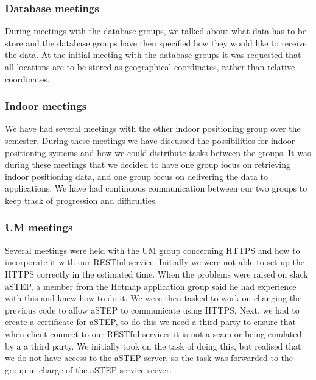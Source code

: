 \subsubsection*{Database meetings}
During meetings with the database groups, we talked about what data has to be store and the database groups have then specified how they would like to receive the data. At the initial meeting with the database groups it was requested that all locations are to be stored as geographical coordinates, rather than relative coordinates.

\subsubsection*{Indoor meetings}
We have had several meetings with the other indoor positioning group over the semester. During these meetings we have discussed the possibilities for indoor positioning systems and how we could distribute tasks between the groups. It was during these meetings that we decided to have one group focus on retrieving indoor positioning data, and one group focus on delivering the data to applications. We have had continuous communication between our two groups to keep track of progression and difficulties.

\subsubsection*{UM meetings}
Several meetings were held with the UM group concerning HTTPS and how to incorporate it with our RESTful service. Initially we were not able to set up the HTTPS correctly in the estimated time. When the problems were raised on slack aSTEP, a member from the Hotmap application group said he had experience with this and knew how to do it. We were then tasked to work on changing the previous code to allow aSTEP to communicate using HTTPS. Next, we had to create a certificate for aSTEP, to do this we need a third party to ensure that when client connect to our RESTful services it is not a scam or being emulated by a a third party. We initially took on the task of doing this, but realised that we do not have access to the aSTEP server, so the task was forwarded to the group in charge of the aSTEP service server. 